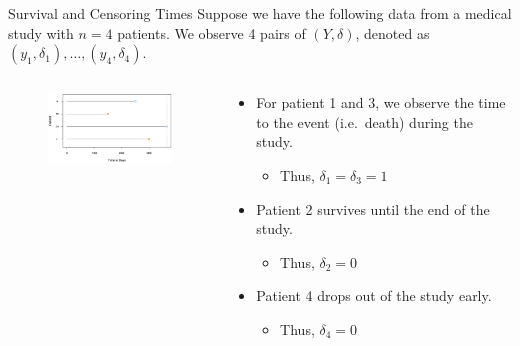 \documentclass[
  ignorenonframetext,
  aspectratio=169,
]{beamer}
\providecommand{\tightlist}{%
  \setlength{\itemsep}{0pt}\setlength{\parskip}{0pt}}\usepackage{longtable,booktabs,array}
\begin{document}
\begin{frame}{Survival and Censoring Times}
\protect\hypertarget{survival-and-censoring-times-1}{}
Suppose we have the following data from a medical study with \(n = 4\)
patients. We observe 4 pairs of \((Y, \delta)\), denoted as
\((y_1, \delta_1), \dots, (y_4, \delta_4)\).

\begin{columns}[T]
\begin{column}{0.6\textwidth}
\begin{figure}

{\centering \includegraphics[width=3.22917in,height=\textheight]{images/patients_time.png}

}

\end{figure}
\end{column}

\begin{column}{0.4\textwidth}
\begin{itemize}
\item
  For patient 1 and 3, we observe the time to the event (i.e.~death)
  during the study.

  \begin{itemize}
  \tightlist
  \item
    Thus, \(\delta_1 = \delta_3 = 1\)
  \end{itemize}
\item
  Patient 2 survives until the end of the study.

  \begin{itemize}
  \tightlist
  \item
    Thus, \(\delta_2 = 0\)
  \end{itemize}
\item
  Patient 4 drops out of the study early.

  \begin{itemize}
  \tightlist
  \item
    Thus, \(\delta_4 = 0\)
  \end{itemize}
\end{itemize}
\end{column}
\end{columns}
\end{frame}
\end{document}
